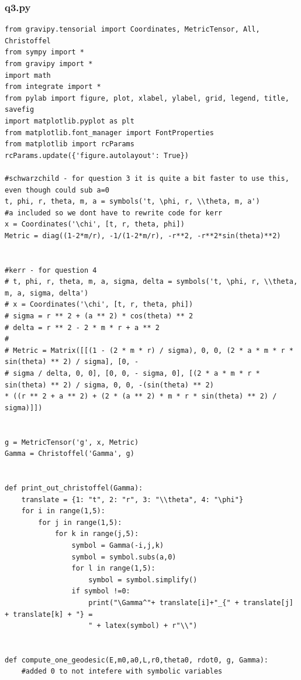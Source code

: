 \documentclass[10pt,a4paper]{report}
\begin{document}
\subsubsection*{q3.py}
\small
\begin{verbatim}
from gravipy.tensorial import Coordinates, MetricTensor, All, Christoffel
from sympy import *
from gravipy import *
import math
from integrate import *
from pylab import figure, plot, xlabel, ylabel, grid, legend, title, savefig
import matplotlib.pyplot as plt
from matplotlib.font_manager import FontProperties
from matplotlib import rcParams
rcParams.update({'figure.autolayout': True})

#schwarzchild - for question 3 it is quite a bit faster to use this, even though could sub a=0
t, phi, r, theta, m, a = symbols('t, \phi, r, \\theta, m, a') 
#a included so we dont have to rewrite code for kerr
x = Coordinates('\chi', [t, r, theta, phi])
Metric = diag((1-2*m/r), -1/(1-2*m/r), -r**2, -r**2*sin(theta)**2)


#kerr - for question 4
# t, phi, r, theta, m, a, sigma, delta = symbols('t, \phi, r, \\theta, m, a, sigma, delta')
# x = Coordinates('\chi', [t, r, theta, phi])
# sigma = r ** 2 + (a ** 2) * cos(theta) ** 2
# delta = r ** 2 - 2 * m * r + a ** 2
#
# Metric = Matrix([[(1 - (2 * m * r) / sigma), 0, 0, (2 * a * m * r * sin(theta) ** 2) / sigma], [0, -
# sigma / delta, 0, 0], [0, 0, - sigma, 0], [(2 * a * m * r * sin(theta) ** 2) / sigma, 0, 0, -(sin(theta) ** 2) 
* ((r ** 2 + a ** 2) + (2 * (a ** 2) * m * r * sin(theta) ** 2) / sigma)]])


g = MetricTensor('g', x, Metric)
Gamma = Christoffel('Gamma', g)


def print_out_christoffel(Gamma):
    translate = {1: "t", 2: "r", 3: "\\theta", 4: "\phi"}
    for i in range(1,5):
        for j in range(1,5):
            for k in range(j,5):
                symbol = Gamma(-i,j,k)
                symbol = symbol.subs(a,0)
                for l in range(1,5):
                    symbol = symbol.simplify()
                if symbol !=0:
                    print("\Gamma^"+ translate[i]+"_{" + translate[j] + translate[k] + "} = 
                    " + latex(symbol) + r"\\")


def compute_one_geodesic(E,m0,a0,L,r0,theta0, rdot0, g, Gamma):
    #added 0 to not intefere with symbolic variables



\end{verbatim}
\end{document}

